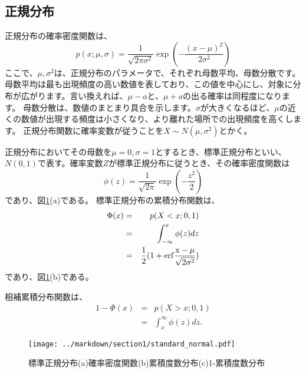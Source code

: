 \documentclass[a4paper,11pt,dvipdfmx]{jsarticle}
\begin{document}
\subsection{正規分布}
正規分布の確率密度関数は、
\begin{equation}
p(x;\mu,\sigma)=\frac{1}{\sqrt{2\pi\sigma^2}}\exp\left(-\frac{(x-\mu)^2}{2\sigma^2} \right)
\end{equation}
ここで、$\mu,\sigma^2$は、正規分布のパラメータで、それぞれ母数平均、母数分散です。
母数平均は最も出現頻度の高い数値を表しており、この値を中心にし、対象に分布が広がります。言い換えれば、$\mu-a$と、$\mu+a$の出る確率は同程度になります。
母数分散は、数値のまとまり具合を示します。$\sigma$が大きくなるほど、$\mu$の近くの数値が出現する頻度は小さくなり、より離れた場所での出現頻度を高くします。
正規分布関数に確率変数が従うことを$X\sim N(\mu,\sigma^2)$とかく。



正規分布においてその母数を$\mu=0,\sigma=1$とするとき、標準正規分布といい、$N(0,1)$で表す。確率変数$Z$が標準正規分布に従うとき、その確率密度関数は
\begin{equation}
\phi(z) = \frac{1}{\sqrt{2\pi}}\exp(-\frac{z^2}{2})
\end{equation}
であり、図\ref{fig:standard_normal_distribution}(a)である。
標準正規分布の累積分布関数は、
\begin{eqnarray}
\Phi(x) &=& p(X<x; 0,1) \\
    &=& \int_{-\infty}^x \phi(z)dz \\
    &=& \frac{1}{2}(1+\rm{erf}\frac{x-\mu}{\sqrt{2\sigma^2}})
\end{eqnarray}
であり、図\ref{fig:standard_normal_distribution}(b)である。

相補累積分布関数は、
\begin{eqnarray}
    1-\Phi(x) &=& p(X>x; 0,1) \\
        &=& \int_{x}^{\infty} \phi(z)dz.
\end{eqnarray}



\begin{figure}
    \begin{center}
        \texttt{[image: ../markdown/section1/standard\_normal.pdf]}
        \caption{標準正規分布(a)確率密度関数(b)累積度数分布(c)1-累積度数分布}
        \label{fig:standard_normal_distribution}

    \end{center}
\end{figure}
    
\end{document}
